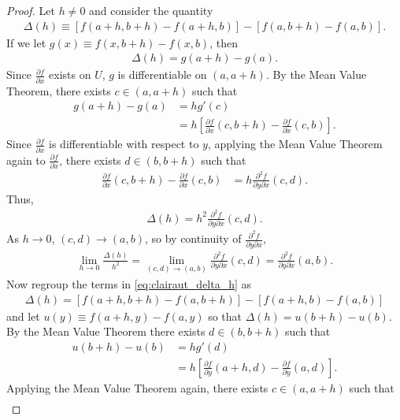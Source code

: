 \documentclass[12pt,letterpaper,reqno]{article}
\numberwithin{equation}{section}
\begin{document}
{\begin{proof}
	Let $h \neq 0$ and consider the quantity
	\begin{align}\label{eq:clairaut_delta_h}
		\Delta(h)\equiv [f(a+h,b+h)-f(a+h,b)]-[f(a,b+h)-f(a,b)].
	\end{align}
	If we let $g(x) \equiv f(x,b+h)-f(x,b)$, then
	\begin{align*}
		\Delta(h)=g(a+h)-g(a).
	\end{align*}
	Since $\frac{\partial f}{\partial x}$ exists  on $U$, $g$ is differentiable on $(a,a+h)$. By the Mean Value Theorem, there exists $c \in (a,a+h)$ such that
	\begin{align*}
		g(a+h)-g(a)&=hg'(c) \\
		&=h\left[\frac{\partial f}{\partial x}(c,b+h)-\frac{\partial f}{\partial x}(c,b)\right].
	\end{align*}
	Since $\frac{\partial f}{\partial x}$ is differentiable with respect to $y$, applying the Mean Value Theorem again to $\frac{\partial f}{\partial x}$, there exists $d \in (b,b+h)$ such that 
	\begin{align*}
		\frac{\partial f}{\partial x}(c,b+h)-\frac{\partial f}{\partial x}(c,b)&=h\frac{\partial^2 f}{\partial y \partial x}(c,d).
	\end{align*}
	Thus,
	\begin{align*}
		\Delta(h)=h^2\frac{\partial^2 f}{\partial y \partial x}(c,d). 
	\end{align*}
	As $h \to 0$, $(c,d) \to (a,b)$, so by continuity of $\frac{\partial^2 f}{\partial y \partial x}$,
	\begin{align*}
		\lim_{h \to 0}\frac{\Delta(h)}{h^2}=\lim_{(c,d) \to (a,b)}\frac{\partial^2 f}{\partial y \partial x}(c,d)=\frac{\partial^2 f}{\partial y \partial x}(a,b).
	\end{align*}
	Now regroup the terms in \eqref{eq:clairaut_delta_h} as 
	\begin{align*}
		\Delta(h)=[f(a+h,b+h)-f(a,b+h)]-[f(a+h,b)-f(a,b)]
	\end{align*}
	and let $u(y)\equiv f(a+h,y)-f(a,y)$ so that $\Delta(h)=u(b+h)-u(b)$. By the Mean Value Theorem there exists $d \in (b,b+h)$ such that 
	\begin{align*}
		u(b+h)-u(b)&=hg'(d) \\
		&=h\left[\frac{\partial f}{\partial y}(a+h,d)-\frac{\partial f}{\partial y}(a,d)\right].
	\end{align*}
	Applying the Mean Value Theorem again, there exists $c \in (a,a+h)$ such that
	\begin{align*}

\end{align*}
\end{proof}}
\end{document}
